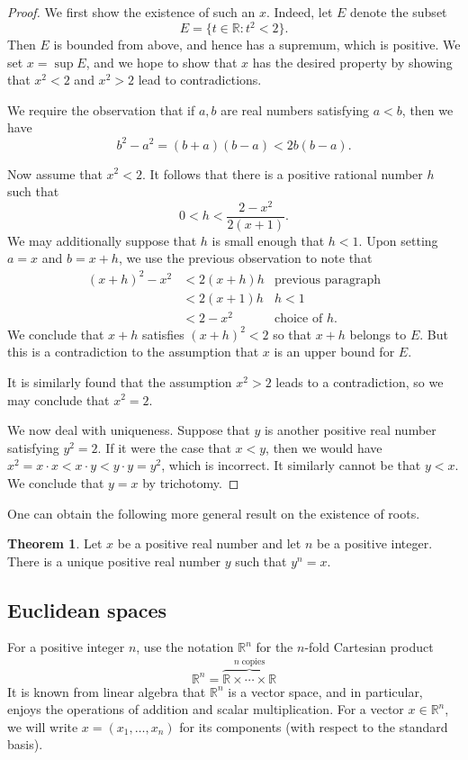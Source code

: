 \documentclass[12pt]{article}
\theoremstyle{definition}
\theoremstyle{theorem}
\newtheorem{theorem}[definition]{Theorem}
\begin{document}
\begin{proof}
We first show the existence of such an $x$. Indeed, let $E$ denote the subset  
\[
E = \{t \in \mathbb{R} : t^2 < 2\}.
\]
Then $E$ is bounded from above, and hence has a supremum, which is positive. We set $x = \sup E$, and we hope to show that $x$ has the desired property by showing that $x^2 < 2$ and $x^2 > 2$ lead to contradictions. 

We require the observation that if $a,b$ are real numbers satisfying $a < b$, then we have 
\[
b^2 - a^2 = (b+a)(b-a) < 2b (b-a).
\]

Now assume that $x^2 < 2$. It follows that there is a positive rational number $h$ such that 
\[
0 < h < \frac{2 - x^2}{2(x+1)}.
\]
We may additionally suppose that $h$ is small enough that $h < 1$. Upon setting $a = x$ and $b = x+h$, we use the previous observation to note that 
\begin{align*}
(x+h)^2 - x^2 &< 2(x+h)h &\text{previous paragraph}\\
&< 2(x+1)h &h < 1 \\
&< 2 - x^2 &\text{choice of $h$}.
\end{align*}
We conclude that $x + h$ satisfies $(x+h)^2 < 2$ so that $x + h$ belongs to $E$. But this is a contradiction to the assumption that $x$ is an upper bound for $E$. 

It is similarly found that the assumption $x^2 > 2$ leads to a contradiction, so we may conclude that $x^2 = 2$. 


We now deal with uniqueness. Suppose that $y$ is another positive real number satisfying $y^2 = 2$. If it were the case that $x < y$, then we would have $x^2 = x \cdot x < x \cdot y < y \cdot y = y^2$, which is incorrect. It similarly cannot be that $y < x$. We conclude that $y = x$ by trichotomy. 
\end{proof}

One can obtain the following more general result on the existence of roots. 

\begin{theorem}
Let $x$ be a positive real number and let $n$ be a positive integer. There is a unique positive real number $y$ such that $y^n = x$. 
\end{theorem}

\subsection{Euclidean spaces}

For a positive integer $n$, use the notation $\mathbb{R}^n$ for the $n$-fold Cartesian product 
\[
\mathbb{R}^n = \overbrace{\mathbb{R} \times \cdots \times \mathbb{R}}^{n \; \text{copies}}
\]
It is known from linear algebra that $\mathbb{R}^n$ is a vector space, and in particular, enjoys the operations of addition and scalar multiplication. For a vector $x \in \mathbb{R}^n$, we will write $x = (x_1, \ldots, x_n)$ for its components (with respect to the standard basis). 
\end{document}
